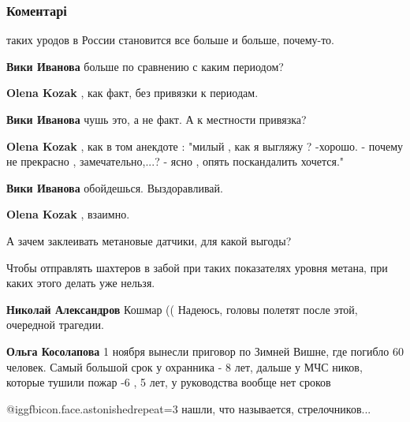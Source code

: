 
 
 
 
 
\subsubsection{Коментарі}

\begin{itemize} %
таких уродов в России становится все больше и больше, почему-то.

\begin{itemize} %
\textbf{Вики Иванова} больше по сравнению с каким периодом?

\textbf{Olena Kozak} , как факт, без привязки к периодам.

\textbf{Вики Иванова} чушь это, а не факт. А к местности привязка?

\textbf{Olena Kozak} , как в том анекдоте : "милый , как я выгляжу ? -хорошо. - почему не прекрасно , замечательно,...? - ясно , опять поскандалить хочется."

\textbf{Вики Иванова} обойдешься. Выздоравливай.

\textbf{Olena Kozak} , взаимно.
\end{itemize} %

А зачем заклеивать метановые датчики, для какой выгоды?

\begin{itemize} %
Чтобы отправлять шахтеров в забой при таких показателях уровня метана, при каких этого делать уже нельзя.

\textbf{Николай Александров} Кошмар (( Надеюсь, головы полетят после этой, очередной трагедии.


\textbf{Ольга Косолапова} 1 ноября вынесли приговор по Зимней Вишне, где погибло 60 человек. Самый большой срок у охранника - 8 лет, дальше у МЧС ников, которые тушили пожар -6 , 5 лет, у руководства вообще нет сроков

 @igg{fbicon.face.astonished}{repeat=3}  нашли, что называется, стрелочников...
\end{itemize} %


\end{itemize}
